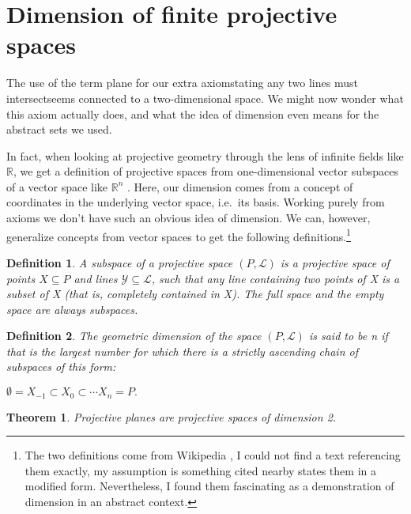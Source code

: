 \documentclass[12pt]{article}
\newtheorem{theorem}{Theorem}
\newtheorem{definition}{Definition}
\begin{document}
    \section{Dimension of finite projective spaces}

    The use of the term plane for our extra axiom\textemdash stating any two lines must intersect\textemdash seems connected to a two-dimensional space.
    We might now wonder what this axiom actually does, and what the idea of dimension even means for the abstract sets we used.

    In fact, when looking at projective geometry through the lens of infinite fields like $\mathbb{R}$,
    we get a definition of projective spaces from one-dimensional vector subspaces of a vector space like $\mathbb{R}^n$ \cite{weisstein_projective_nodate}.
    Here, our dimension comes from a concept of coordinates in the underlying vector space, i.e.\ its basis.
    Working purely from axioms we don't have such an obvious idea of dimension.
    We can, however, generalize concepts from vector spaces to get the following definitions.\footnote{
        The two definitions come from Wikipedia \cite{noauthor_projective_2024},
        I could not find a text referencing them exactly, my assumption is something cited nearby states them in a modified form.
        Nevertheless, I found them fascinating as a demonstration of dimension in an abstract context.
    }

    \begin{definition}
        A subspace of a projective space $(P, \mathcal{L})$ is a projective space of points $X \subseteq P$ and lines $\mathcal{Y} \subseteq \mathcal{L}$,
        such that any line containing two points of X is a subset of X (that is, completely contained in X).
        The full space and the empty space are always subspaces.
    \end{definition}

    \begin{definition}
        The geometric dimension of the space $(P, \mathcal{L})$ is said to be n if that is the largest number for which there is a strictly ascending chain of subspaces of this form:
        \begin{center}
            $\emptyset = X_{-1}\subset X_{0}\subset \cdots X_{n}=P.$
        \end{center}
    \end{definition}

    \begin{theorem}
        Projective planes are projective spaces of dimension 2.
    \end{theorem}
\end{document}
